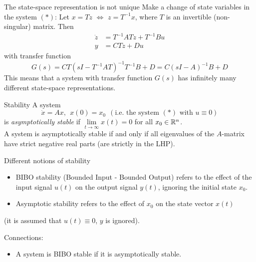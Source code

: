 \documentclass[presentation,aspectratio=1610]{beamer}
\begin{document}
\begin{frame}[label={sec:org94244a4}]{The state-space representation is not unique}
Make a change of state variables in the system \((*)\):
Let \(x=Tz\) \(\Leftrightarrow\) \(z=T^{-1}x\), where \(T\) is an invertible (non-singular) matrix. Then
\begin{align*}
\dot{z}&=T^{-1}ATz+T^{-1}Bu\\ y&=CTz+Du
\end{align*}
with transfer function
\begin{equation*}
G(s)=CT\left(sI-T^{-1}AT\right)^{-1}T^{-1}B+D=C(sI-A)^{-1}B+D
\end{equation*}
This means that a system with transfer function \(G(s)\) has infinitely many different state-space representations.
\end{frame}

\begin{frame}[label={sec:orgfe0952e}]{Stability}
A system 
\begin{equation*}
\dot{x}=Ax, \ \ x(0)=x_0\ \ (\text{i.e.\ the system }(*) \text{ with } u\equiv 0)
\end{equation*}
is \emph{asymptotically stable}  if  \(\underset{t\to\infty}{\lim}x(t)=0\) for all  \(x_0\in\Bbb{R}^n\).\\

A system is asymptotically stable if and only if all eigenvalues of the \(A\)-matrix have strict negative real parts (are strictly in the LHP). 
\end{frame}

\begin{frame}[label={sec:orgf6d1fc8}]{Different notions of stability}
\begin{itemize}
\item BIBO stability (Bounded Input - Bounded Output) refers to the effect of the input signal \(u(t)\) on the output signal \(y(t)\), ignoring the initial state \(x_0\).
\item Asymptotic stability refers to the effect of  \(x_0\) on the state vector \(x(t)\)
\end{itemize}
(it is assumed that \(u(t)\equiv 0\), \(y\) is ignored).

Connections:
\begin{itemize}
\item A system is BIBO stable if it is asymptotically stable.
\end{itemize}
\end{frame}
\end{document}
